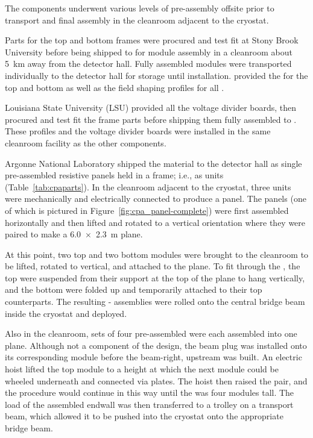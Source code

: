 The   components underwent %
various levels of pre-assembly offsite prior to transport and final assembly in the  cleanroom adjacent to the cryostat.

Parts for the top and bottom  frames were procured and test fit at Stony Brook University before being shipped to  for module assembly in a cleanroom about \SI{5}{km} away from the detector hall.
Fully assembled modules were transported individually to the detector hall for storage until installation.  provided the  for the top and bottom  as well as the field shaping profiles for all .


Louisiana State University (LSU) provided all the voltage divider boards, then procured and test fit the  frame parts before shipping them fully assembled to .
These profiles and the voltage divider boards were installed in the same  cleanroom facility as the other  components.

Argonne National Laboratory shipped the  material to the detector hall as single pre-assembled resistive panels held in a \frfour frame; i.e., as  units (Table~\ref{tab:cpaparts}). 
In the cleanroom adjacent to the  cryostat, three  units were mechanically and electrically connected to produce a  panel. 
The  panels (one of which is pictured in Figure~\ref{fig:cpa_panel-complete}) were first assembled horizontally and then lifted and rotated to a vertical orientation where they were paired to make a \SI{6.0 x 2.3}{m}  plane.

At this point, two top and two bottom  modules were brought to the cleanroom to be lifted, rotated to vertical, and attached to the  plane. 
To fit through the , the top  were suspended from their support at the top of the  plane to hang vertically, and the bottom  were folded up and temporarily attached to their top  counterparts.
The resulting - assemblies were rolled onto the central bridge beam inside the cryostat and %
deployed. 

Also in the  cleanroom, sets of four pre-assembled  %
were each assembled into one  plane. %
Although not a component of the  design, 
the beam plug was installed onto its corresponding module %
before the beam-right, upstream  was built.
An electric hoist lifted the top %
module to a height at which the next %
module could be wheeled underneath and connected via  plates.
The hoist then raised the pair, and the procedure would continue in this way until the  was four %
modules tall.
The load of the assembled endwall was then transferred to a trolley on a transport beam, which allowed it to be pushed into the cryostat onto the appropriate bridge beam.

